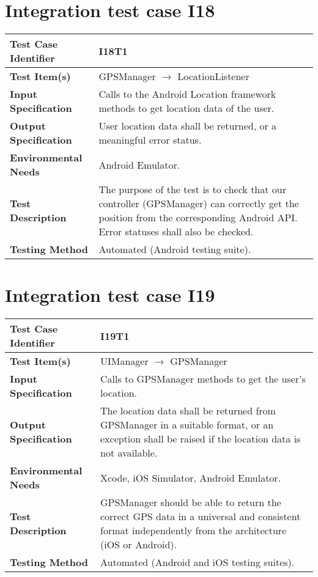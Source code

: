 \vspace{2em}

\section{Integration test case I18}

\begin{tabular}{l p{}}
    \hline
    \textbf{Test Case Identifier} & I18T1\\
    \hline
    \textbf{Test Item(s)} & GPSManager $\rightarrow$ LocationListener \\
    \hline
    \textbf{Input Specification} & Calls to the Android Location framework methods to get location data of the user. \\
    \hline
    \textbf{Output Specification} & User location data shall be returned, or a meaningful error status. \\
    \hline
    \textbf{Environmental Needs} & Android Emulator. \\
    \hline
    \textbf{Test Description} & The purpose of the test is to check that our controller (GPSManager) can correctly get the position from the corresponding Android API. Error statuses shall also be checked. \\
    \hline
    \textbf{Testing Method} & Automated (Android testing suite). \\
    \hline
\end{tabular}

\vspace{2em}

\section{Integration test case I19}

\begin{tabular}{l p{}}
    \hline
    \textbf{Test Case Identifier} & I19T1\\
    \hline
    \textbf{Test Item(s)} & UIManager $\rightarrow$ GPSManager \\
    \hline
    \textbf{Input Specification} & Calls to GPSManager methods to get the user's location. \\
    \hline
    \textbf{Output Specification} & The location data shall be returned from GPSManager in a suitable format, or an exception shall be raised if the location data is not available. \\
    \hline
    \textbf{Environmental Needs} & Xcode, iOS Simulator, Android Emulator.\\
    \hline
    \textbf{Test Description} & GPSManager should be able to return the correct GPS data in a universal and consistent format independently from the architecture (iOS or Android).\\
    \hline
    \textbf{Testing Method} & Automated (Android and iOS testing suites). \\
    \hline
\end{tabular}

